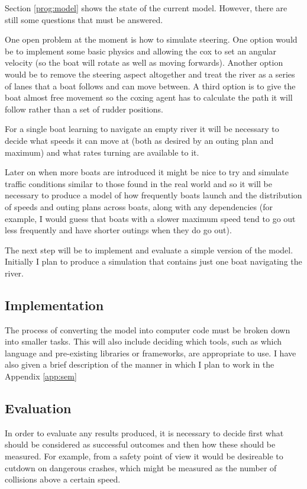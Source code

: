 Section \ref{prog:model} shows the state of the current
model. However, there are still some questions that must be
answered.

One open problem at the moment is how to simulate steering. One option would be to implement some basic physics and allowing the cox to set an angular velocity (so the boat will rotate as well as moving forwards). Another option would be to remove the steering aspect altogether and treat the river as a series of lanes that a boat follows and can move between. A third option is to give the boat almost free movement so the coxing agent has to calculate the path it will follow rather than a set of rudder positions.

For a single boat learning to navigate an empty river it will be necessary to decide what speeds it can
move at (both as desired by an outing plan and maximum) and what rates
turning are available to it. 

Later on when more boats are introduced
it might be nice to try and simulate traffic conditions similar to
those found in the real world and
so it will be necessary to produce a model of how frequently boats
launch and the distribution of speeds and outing plans across boats,
along with any dependencies (for example, I would guess that boats
with a slower maximum speed tend to go out less frequently and have
shorter outings when they do go out).

The next step will be to implement and evaluate a simple version of the model. Initially I plan to produce a simulation that contains just one boat navigating the river. 

\subsection{Implementation}
The process of converting
the model into computer code must be broken down into smaller
tasks. This will also include deciding which tools, such as which
language and pre-existing libraries or frameworks, are appropriate 
to use. I have also given a brief description of the manner in which I
plan to work in the Appendix \ref{app:sem}

\subsection{Evaluation}
In order to evaluate any results produced, it is necessary to decide
first what should be considered as successful outcomes and then how
these should be measured. For example, from a safety point of view it
would be desireable to cutdown on dangerous crashes, which might be
measured as the number of collisions above a certain speed.
